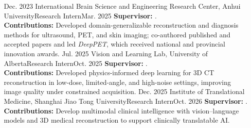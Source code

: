 
\begin{experiences}
\experience
   {Dec. 2023}   {International Brain Science and Engineering Research Center, Anhui University}{Research Intern}{Mar. 2025}
    {\textbf{Supervisor:} .\\ \textbf{Contributions:} Developed domain-generalizable reconstruction and diagnosis methods for ultrasound, PET, and skin imaging; co-authored published and accepted papers and led \emph{DeepPET}, which received national and provincial innovation awards.}
\experience
   {Jul. 2025}   {Vision and Learning Lab, University of Alberta}{Research Intern}{Oct. 2025}
  {\textbf{Supervisor:} .\\ \textbf{Contributions:} Developed physics-informed deep learning for 3D CT reconstruction in low-dose, limited-angle, and high-noise settings, improving image quality under constrained acquisition.}
\experience
   {Dec. 2025}   {Institute of Translational Medicine, Shanghai Jiao Tong University}{Research Intern}{Oct. 2026}
  {\textbf{Supervisor:} .\\ \textbf{Contributions:} Develop multimodal clinical intelligence with vision--language models and 3D medical reconstruction to support clinically translatable AI.}


\end{experiences}
